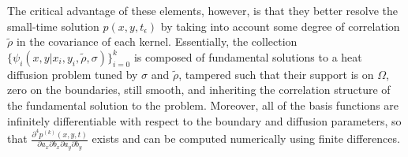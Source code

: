 \documentclass[10pt]{article}
\begin{document}
The critical advantage of these elements, however, is that they better
resolve the small-time solution $p(x,y,t_\epsilon)$ by taking into
account some degree of correlation $\tilde{\rho}$ in the covariance of
each kernel.  Essentially, the collection
$\{ \psi_i(x,y| x_i, y_i, \tilde{\rho}, \sigma) \}_{i=0}^k$ is
composed of fundamental solutions to a heat diffusion problem tuned by
$\sigma$ and $\tilde{\rho}$, tampered such that their support is on
$\Omega$, zero on the boundaries, still smooth, and inheriting the
correlation structure of the fundamental solution to the
problem. %
Moreover, all of the basis functions are infinitely differentiable
with respect to the boundary and diffusion parameters, so that
$\frac{\partial^4 p^{(k)}(x,y,t)}{\partial a_x \partial b_x \partial
  a_y \partial b_y}$ exists and can be computed numerically using
finite differences.
\end{document}
